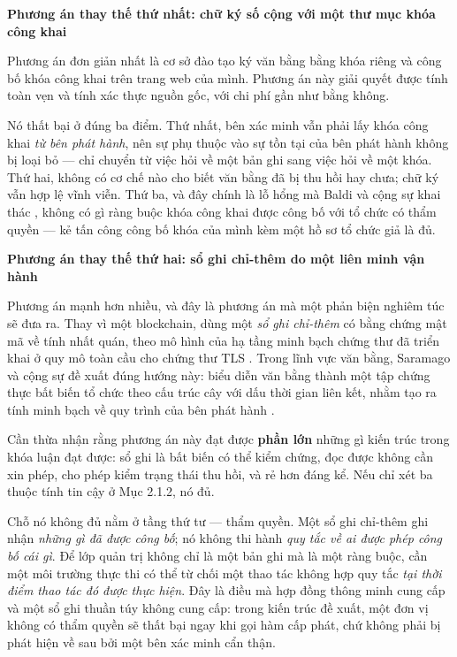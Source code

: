 \noindent \textbf{Phương án thay thế thứ nhất: chữ ký số cộng với một thư mục khóa công khai}

Phương án đơn giản nhất là cơ sở đào tạo ký văn bằng bằng khóa riêng và công bố khóa công khai trên trang web của mình. Phương án này giải quyết được tính toàn vẹn và tính xác thực nguồn gốc, với chi phí gần như bằng không.

Nó thất bại ở đúng ba điểm. Thứ nhất, bên xác minh vẫn phải lấy khóa công khai \emph{từ bên phát hành}, nên sự phụ thuộc vào sự tồn tại của bên phát hành không bị loại bỏ --- chỉ chuyển từ việc hỏi về một bản ghi sang việc hỏi về một khóa. Thứ hai, không có cơ chế nào cho biết văn bằng đã bị thu hồi hay chưa; chữ ký vẫn hợp lệ vĩnh viễn. Thứ ba, và đây chính là lỗ hổng mà Baldi và cộng sự khai thác \cite{Baldi2019}, không có gì ràng buộc khóa công khai được công bố với tổ chức có thẩm quyền --- kẻ tấn công công bố khóa của mình kèm một hồ sơ tổ chức giả là đủ.

\noindent \textbf{Phương án thay thế thứ hai: sổ ghi chỉ-thêm do một liên minh vận hành}

Phương án mạnh hơn nhiều, và đây là phương án mà một phản biện nghiêm túc sẽ đưa ra. Thay vì một blockchain, dùng một \emph{sổ ghi chỉ-thêm} có bằng chứng mật mã về tính nhất quán, theo mô hình của hạ tầng minh bạch chứng thư đã triển khai ở quy mô toàn cầu cho chứng thư TLS \cite{RFC6962}. Trong lĩnh vực văn bằng, Saramago và cộng sự đề xuất đúng hướng này: biểu diễn văn bằng thành một tập chứng thực bất biến tổ chức theo cấu trúc cây với dấu thời gian liên kết, nhằm tạo ra tính minh bạch về quy trình của bên phát hành \cite{Saramago2021}.

Cần thừa nhận rằng phương án này đạt được \textbf{phần lớn} những gì kiến trúc trong khóa luận đạt được: sổ ghi là bất biến có thể kiểm chứng, đọc được không cần xin phép, cho phép kiểm trạng thái thu hồi, và rẻ hơn đáng kể. Nếu chỉ xét ba thuộc tính tin cậy ở Mục 2.1.2, nó đủ.

Chỗ nó không đủ nằm ở tầng thứ tư --- thẩm quyền. Một sổ ghi chỉ-thêm ghi nhận \emph{những gì đã được công bố}; nó không thi hành \emph{quy tắc về ai được phép công bố cái gì}. Để lớp quản trị không chỉ là một bản ghi mà là một ràng buộc, cần một môi trường thực thi có thể từ chối một thao tác không hợp quy tắc \emph{tại thời điểm thao tác đó được thực hiện}. Đây là điều mà hợp đồng thông minh cung cấp và một sổ ghi thuần túy không cung cấp: trong kiến trúc đề xuất, một đơn vị không có thẩm quyền sẽ thất bại ngay khi gọi hàm cấp phát, chứ không phải bị phát hiện về sau bởi một bên xác minh cẩn thận.

